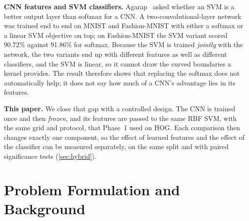\documentclass[conference]{IEEEtran}
\begin{document}
\textbf{CNN features and SVM classifiers.} Agarap~\cite{agarap2017cnnsvm} asked whether an SVM is a better output layer
than softmax for a CNN. A two-convolutional-layer network was trained end to end on MNIST and Fashion-MNIST with either
a softmax or a linear SVM objective on top; on Fashion-MNIST the SVM variant scored 90.72\% against 91.86\% for softmax.
Because the SVM is trained \emph{jointly} with the network, the two variants end up with different features as well as
different classifiers, and the SVM is linear, so it cannot draw the curved boundaries a kernel provides. The result
therefore shows that replacing the softmax does not automatically help; it does not say how much of a CNN's advantage
lies in its features.

\textbf{This paper.} We close that gap with a controlled design. The CNN is trained once and then \emph{frozen}, and its
features are passed to the same RBF SVM, with the same grid and protocol, that Phase~1 used on HOG. Each comparison then
changes exactly one component, so the effect of learned features and the effect of the classifier can be measured
separately, on the same split and with paired significance tests (\cref{sec:hybrid}).

\section{Problem Formulation and Background}
\label{sec:background}
\end{document}
